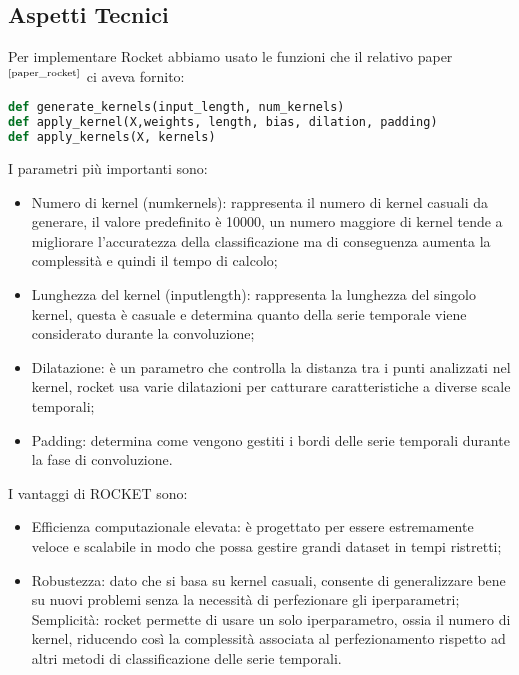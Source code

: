 \subsection{Aspetti Tecnici}
Per implementare Rocket abbiamo usato le funzioni che il relativo paper$^\text{{\cite{paper_rocket}}}$ ci aveva fornito:
\begin{lstlisting}[language=Python]
def generate_kernels(input_length, num_kernels)
def apply_kernel(X,weights, length, bias, dilation, padding)
def apply_kernels(X, kernels)
\end{lstlisting}
I parametri più importanti sono:
\begin{itemize}
    \item Numero di kernel (num\textunderscore kernels): rappresenta il numero di kernel casuali da generare, il valore predefinito è 10000, un numero maggiore di kernel tende a migliorare l'accuratezza della classificazione ma di conseguenza aumenta la complessità e quindi il tempo di calcolo;
    \item Lunghezza del kernel (input\textunderscore length): rappresenta la lunghezza del singolo kernel, questa è casuale e determina quanto della serie temporale viene considerato durante la convoluzione;
    \item Dilatazione: è un parametro che controlla la distanza tra i punti analizzati nel kernel, rocket usa varie dilatazioni per catturare caratteristiche a diverse scale temporali;
    \item Padding: determina come vengono gestiti i bordi delle serie temporali durante la fase di convoluzione.
\end{itemize} 

I vantaggi di ROCKET sono:
\begin{itemize}
    \item Efficienza computazionale elevata: è progettato per essere estremamente veloce e scalabile in modo che possa gestire grandi dataset in tempi ristretti;
    \item Robustezza: dato che si basa su kernel casuali, consente di generalizzare bene su nuovi problemi senza la necessità di perfezionare gli iperparametri;
    Semplicità: rocket permette di usare un solo iperparametro, ossia il numero di kernel, riducendo così la complessità associata al perfezionamento rispetto ad altri metodi di classificazione delle serie temporali.
\end{itemize}

